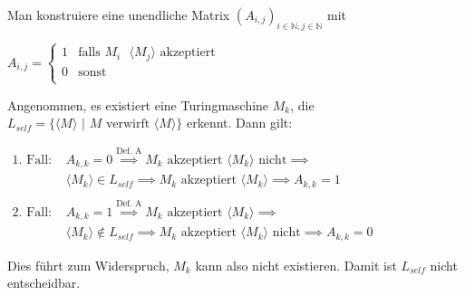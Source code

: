 
Man konstruiere eine unendliche Matrix $(A_{i, j})_{i \in \mathbb{N}, j \in \mathbb{N}}$ mit
\begin{center}
$A_{i, j} = 
\begin{cases}
     1 & \text{falls $M_i$ $\langle M_j \rangle$ akzeptiert} \\
     0 & \text{sonst} \\
\end{cases}
$
\end{center}
Angenommen, es existiert eine Turingmaschine $M_k$, die $L_{self} =
	\{\langle M \rangle \text{ | $M$ verwirft $\langle M \rangle$}\}$ erkennt.
Dann gilt:
\begin{center}
$
\begin{aligned}
\text{1. Fall: } &A_{k, k} = 0 \overset{\text{Def. A}}{\implies} \text{$M_k$ akzeptiert $\langle M_k \rangle$ nicht} \implies\\
& \langle M_k \rangle \in L_{self} \implies \text{$M_k$ akzeptiert $\langle M_k \rangle$} \implies A_{k, k} = 1
\\\\
\text{2. Fall: } &A_{k, k} = 1 \overset{\text{Def. A}}{\implies} \text{$M_k$ akzeptiert $\langle M_k \rangle$} \implies\\
& \langle M_k \rangle \notin L_{self} \implies \text{$M_k$ akzeptiert $\langle M_k \rangle$ nicht} \implies A_{k,k} = 0
\end{aligned}
$
\end{center}
Dies führt zum Widerspruch, $M_k$ kann also nicht existieren.
Damit ist $L_{self}$ nicht entscheidbar.
